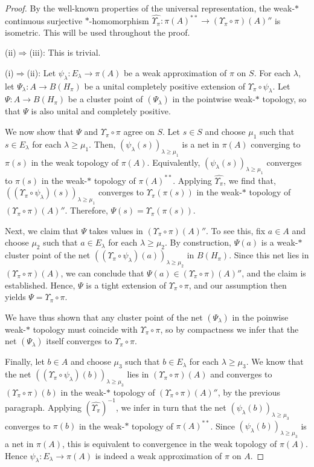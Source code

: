 \documentclass[10pt]{amsart}
\theoremstyle{definition}
\begin{document}
\begin{proof}
By the well-known properties of the universal representation,  the weak-$*$ continuous surjective $*$-homomorphism $\widehat{\Upsilon_\pi}:\pi(A)^{**}\to (\Upsilon_\pi\circ\pi)(A)''$ is isometric. This will be used throughout the proof. 

(ii)$\Rightarrow$(iii): This is trivial.

(i)$\Rightarrow$(ii):  Let $\psi_\lambda:E_\lambda\to \pi(A)$ be a weak approximation of $\pi$ on $S$. For each $\lambda$, let $\Psi_\lambda:A\to B(H_\pi)$ be a unital completely positive extension of $\Upsilon_\pi\circ  \psi_\lambda$. Let $\Psi:A\to B(H_\pi)$ be a cluster point of $(\Psi_\lambda)$ in the pointwise weak-$*$ topology, so that $\Psi$ is also unital and completely positive. 

We now show that $\Psi$ and $\Upsilon_\pi\circ \pi$ agree on $S$.
Let $s\in S$ and choose $\mu_1$ such that $s\in E_\lambda$ for each $\lambda\geq \mu_1$. Then,  $(\psi_\lambda(s))_{\lambda\geq \mu_1}$ is a net in $\pi(A)$ converging to $\pi(s)$ in the weak topology of $\pi(A)$. Equivalently, $(\psi_\lambda(s))_{\lambda\geq \mu_1}$  converges to $\pi(s)$ in the weak-$*$ topology of $\pi(A)^{**}$. Applying $\widehat{\Upsilon_\pi}$, we find that, $((\Upsilon_\pi\circ \psi_\lambda)(s))_{\lambda\geq \mu_1}$ converges to $\Upsilon_\pi(\pi(s))$ in the weak-$*$ topology of $(\Upsilon_\pi\circ \pi)(A)''$. Therefore, $\Psi(s)=\Upsilon_\pi(\pi(s))$.


Next, we claim that $\Psi$ takes values in $(\Upsilon_\pi\circ \pi)(A)''$. To see this, fix $a\in A$ and choose $\mu_2$ such that $a\in E_\lambda$ for each $\lambda\geq \mu_2$. By construction,  $\Psi(a)$ is a weak-$*$ cluster point of the net $((\Upsilon_\pi\circ \psi_\lambda)(a))_{\lambda\geq \mu_2}$ in $B(H_\pi)$. Since this net lies in $(\Upsilon_\pi\circ \pi)(A)$, we can conclude that $\Psi(a)\in (\Upsilon_\pi\circ \pi)(A)''$, and the claim is established. Hence, $\Psi$ is a tight extension of $\Upsilon_\pi\circ \pi$, and our assumption then yields $\Psi=\Upsilon_\pi\circ\pi$.

We have  thus shown that any cluster point of the net $(\Psi_\lambda)$ in the poinwise weak-$*$ topology must coincide with $\Upsilon_\pi\circ \pi$, so by compactness we infer that the net $(\Psi_\lambda)$ itself converges to $\Upsilon_\pi\circ \pi$. 


Finally, let $b\in A$ and choose $\mu_3$ such that $b\in E_\lambda$ for each $\lambda\geq \mu_3$. We know that the net $((\Upsilon_\pi\circ \psi_\lambda)(b))_{\lambda\geq \mu_3}$ lies in $(\Upsilon_\pi\circ \pi)(A)$ and converges to $(\Upsilon_\pi\circ\pi)(b)$ in the weak-$*$ topology of $(\Upsilon_\pi\circ \pi)(A)''$, by the previous paragraph. Applying $(\widehat{\Upsilon_\pi})^{-1}$, we infer in turn that the net $(\psi_\lambda(b))_{\lambda\geq \mu_3}$ converges to $\pi(b)$ in the weak-$*$ topology of $\pi(A)^{**}$. Since $(\psi_\lambda(b))_{\lambda\geq \mu_3}$ is a net in $\pi(A)$, this is equivalent to convergence in the weak topology of $\pi(A)$. Hence $\psi_\lambda:E_\lambda\to \pi(A)$ is indeed a weak approximation of $\pi$ on $A$.



\end{proof}
\end{document}
